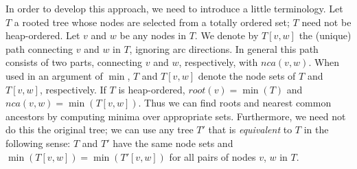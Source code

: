 \documentclass[twoside,leqno,twocolumn]{article}
\newcommand{\nca}{\mathit{nca}}
\newcommand{\rootn}{\mathit{root}}
\begin{document}
In order to develop this approach, we need to introduce a little terminology.  Let $T$ a rooted tree whose nodes are selected from a totally ordered set; $T$ need not be heap-ordered.  Let $v$ and $w$ be any nodes in $T$.  We denote by $T[v, w]$ the (unique) path connecting $v$ and $w$ in $T$, ignoring arc directions.  In general this path consists of two parts, connecting $v$ and $w$, respectively, with $\nca(v, w)$.  When used in an argument of $\min$, $T$ and $T[v,w]$ denote the node sets of $T$ and $T[v, w]$, respectively.  If $T$ is heap-ordered, $\rootn(v) = \min(T)$ and $\nca(v, w) = \min(T[v, w])$.  Thus we can find roots and nearest common ancestors by computing minima over appropriate sets.  Furthermore, we need not do this the original tree; we can use any tree $T'$ that is \emph{equivalent} to $T$ in the following sense: $T$ and $T'$ have the same node sets and $\min(T[v, w]) = \min(T'[v, w])$ for all pairs of nodes $v$, $w$ in $T$.
\end{document}
